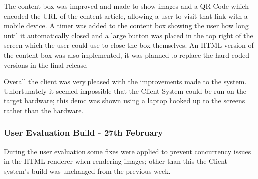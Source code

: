 The content box was improved and made to show images and a QR Code which 
encoded the URL of the content article, allowing a user to visit that link with
a mobile device. A timer was added to the content box showing the user how long
until it automatically closed and a large button was placed in the top right of
the screen which the user could use to close the box themselves. An HTML 
version of the content box was also implemented, it was planned to replace the
hard coded versions in the final release. 

Overall the client was very pleased with the improvements made to the system.
Unfortunately it seemed impossible that the Client System could be run on the
target hardware; this demo was shown using a laptop hooked up to the screens
rather than the hardware.

\subsubsection{User Evaluation Build - 27th February}
During the user evaluation some fixes were applied to prevent concurrency 
issues in the HTML renderer when rendering images; other than this the Client 
system's build was unchanged from the previous week.

\clearpage{}
